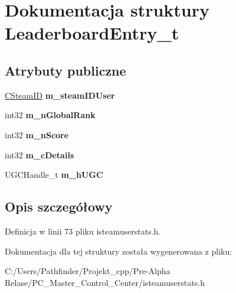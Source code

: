 \hypertarget{struct_leaderboard_entry__t}{}\section{Dokumentacja struktury Leaderboard\+Entry\+\_\+t}
\label{struct_leaderboard_entry__t}
\subsection*{Atrybuty publiczne}
\begin{DoxyCompactItemize}
\item 
\mbox{\label{struct_leaderboard_entry__t_a031fe87b9806d39a3fc1b3b5dd5ef014}} 
\hyperlink{class_c_steam_i_d}{C\+Steam\+ID} {\bfseries m\+\_\+steam\+I\+D\+User}
\item 
\mbox{\label{struct_leaderboard_entry__t_af7f941b570f44f907dc1cee5cae888ea}} 
int32 {\bfseries m\+\_\+n\+Global\+Rank}
\item 
\mbox{\label{struct_leaderboard_entry__t_a6032254adc05d810cfe7b3c214fdafea}} 
int32 {\bfseries m\+\_\+n\+Score}
\item 
\mbox{\label{struct_leaderboard_entry__t_adf2c9fa2d9bed13e9bdf86f36f5730d8}} 
int32 {\bfseries m\+\_\+c\+Details}
\item 
\mbox{\label{struct_leaderboard_entry__t_ab11176f3288ff721245ede6e49877947}} 
U\+G\+C\+Handle\+\_\+t {\bfseries m\+\_\+h\+U\+GC}
\end{DoxyCompactItemize}


\subsection{Opis szczegółowy}


Definicja w linii 73 pliku isteamuserstats.\+h.



Dokumentacja dla tej struktury została wygenerowana z pliku\+:\begin{DoxyCompactItemize}
\item 
C\+:/\+Users/\+Pathfinder/\+Projekt\+\_\+cpp/\+Pre-\/\+Alpha Relase/\+P\+C\+\_\+\+Master\+\_\+\+Control\+\_\+\+Center/isteamuserstats.\+h\end{DoxyCompactItemize}
